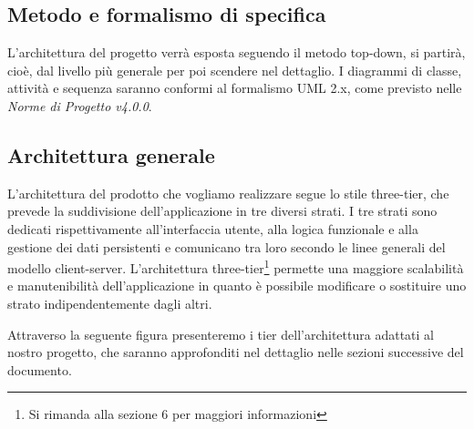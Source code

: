 \subsection{Metodo e formalismo di specifica}
L'architettura del progetto verrà esposta seguendo il metodo \gls{top-down}, si partirà, cioè, dal livello più generale per poi scendere nel dettaglio. I diagrammi di classe, attività e sequenza saranno conformi al formalismo \gls{UML} 2.x, come previsto nelle \textit{Norme di Progetto v4.0.0}.

\subsection{Architettura generale}
L'architettura del prodotto che vogliamo realizzare segue lo stile three-tier, che prevede la suddivisione dell'applicazione in tre diversi strati. I tre strati sono dedicati rispettivamente all'interfaccia utente, alla logica funzionale e alla gestione dei dati persistenti e comunicano tra loro secondo le linee generali del modello client-server. L'architettura three-tier\footnote{Si rimanda alla sezione 6 per maggiori informazioni} permette una maggiore scalabilità e manutenibilità dell'applicazione in quanto è possibile modificare o sostituire uno strato indipendentemente dagli altri.

Attraverso la seguente figura presenteremo i tier dell'architettura adattati al nostro progetto, che saranno approfonditi nel dettaglio nelle sezioni successive del documento.

